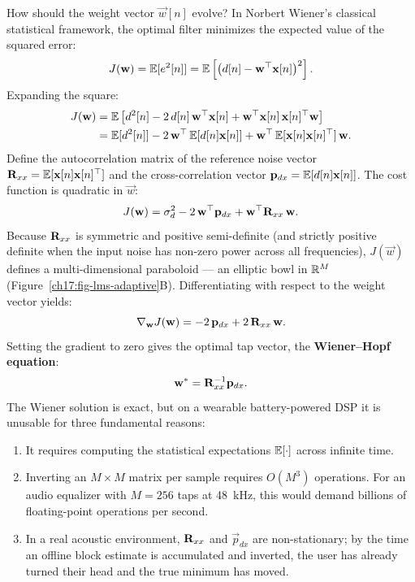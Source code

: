 How should the weight vector $\vec{w}[n]$ evolve?
In Norbert Wiener's classical statistical framework, the optimal filter minimizes the expected value of the squared error:
\begin{equation}
  J(\mathbf{w}) = \operatorname{\mathbb{E}}[e^2[n]] = \operatorname{\mathbb{E}}\left[\big(d[n] - \mathbf{w}^\top \mathbf{x}[n]\big)^2\right] .
  \label{ch17:eq-mse-cost}
\end{equation}
Expanding the square:
\begin{align}
  J(\mathbf{w}) &= \operatorname{\mathbb{E}}\left[d^2[n] - 2\, d[n]\,\mathbf{w}^\top \mathbf{x}[n] + \mathbf{w}^\top \mathbf{x}[n]\,\mathbf{x}[n]^\top \mathbf{w}\right] \notag \\
             &= \operatorname{\mathbb{E}}[d^2[n]] - 2\,\mathbf{w}^\top \operatorname{\mathbb{E}}[d[n]\mathbf{x}[n]] + \mathbf{w}^\top \operatorname{\mathbb{E}}[\mathbf{x}[n]\mathbf{x}[n]^\top]\, \mathbf{w} .
  \label{ch17:eq-mse-expanded}
\end{align}
Define the autocorrelation matrix of the reference noise vector $\mathbf{R}_{xx} = \operatorname{\mathbb{E}}[\mathbf{x}[n]\mathbf{x}[n]^\top]$ and the cross-correlation vector $\mathbf{p}_{dx} = \operatorname{\mathbb{E}}[d[n]\mathbf{x}[n]]$. The cost function is quadratic in $\vec{w}$:
\begin{equation}
  J(\mathbf{w}) = \sigma_d^2 - 2\,\mathbf{w}^\top \mathbf{p}_{dx} + \mathbf{w}^\top \mathbf{R}_{xx}\, \mathbf{w} .
  \label{ch17:eq-quadratic-bowl}
\end{equation}
Because $\mathbf{R}_{xx}$ is symmetric and positive semi-definite (and strictly positive definite when the input noise has non-zero power across all frequencies), $J(\vec{w})$ defines a multi-dimensional paraboloid --- an elliptic bowl in $\mathbb{R}^M$ (Figure~\ref{ch17:fig-lms-adaptive}B). Differentiating with respect to the weight vector yields:
\begin{equation}
  \nabla_{\mathbf{w}} J(\mathbf{w}) = -2\,\mathbf{p}_{dx} + 2\,\mathbf{R}_{xx}\, \mathbf{w} .
  \label{ch17:eq-wiener-grad}
\end{equation}
Setting the gradient to zero gives the optimal tap vector, the \textbf{Wiener--Hopf equation}:
\begin{equation}
  \mathbf{w}^* = \mathbf{R}_{xx}^{-1} \mathbf{p}_{dx} .
  \label{ch17:eq-wiener-solution}
\end{equation}
The Wiener solution is exact, but on a wearable battery-powered DSP it is unusable for three fundamental reasons:
\begin{enumerate}
  \item It requires computing the statistical expectations $\operatorname{\mathbb{E}}[\cdot]$ across infinite time.
  \item Inverting an $M \times M$ matrix per sample requires $O(M^3)$ operations. For an audio equalizer with $M = 256$ taps at 48~kHz, this would demand billions of floating-point operations per second.
  \item In a real acoustic environment, $\mathbf{R}_{xx}$ and $\vec{p}_{dx}$ are non-stationary; by the time an offline block estimate is accumulated and inverted, the user has already turned their head and the true minimum has moved.
\end{enumerate}

